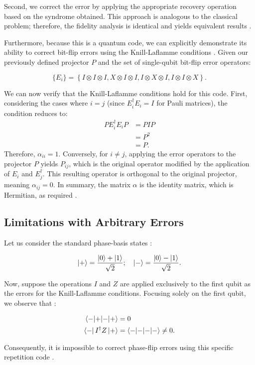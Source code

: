 Second, we correct the error by applying the appropriate recovery operation based on the syndrome obtained. This approach is analogous to the classical problem; therefore, the fidelity analysis is identical and yields equivalent results \citep{Nielsen2010}.

Furthermore, because this is a quantum code, we can explicitly demonstrate its ability to correct bit-flip errors using the Knill-Laflamme conditions \citep{Nielsen2010}. Given our previously defined projector $P$ and the set of single-qubit bit-flip error operators:

\begin{equation}
\{E_i\} = \left\{I \otimes I \otimes I, X \otimes I \otimes I, I \otimes X \otimes I, I \otimes I \otimes X \right\}
.\end{equation}

We can now verify that the Knill-Laflamme conditions hold for this code. First, considering the cases where $i = j$ (since $E_i^\dagger E_i = I$ for Pauli matrices), the condition reduces to:
\begin{align*}
  P E_i^\dagger E_i P &= P I P \\
  &= P^2 \\
  &= P
.\end{align*}
Therefore, $\alpha_{ii} = 1$. Conversely, for $i \neq j$, applying the error operators to the projector $P$ yields $P_{ij}$, which is the original operator modified by the application of $E_i$ and $E_j^\dagger$. This resulting operator is orthogonal to the original projector, meaning $\alpha_{ij} = 0$. In summary, the matrix $\alpha$ is the identity matrix, which is Hermitian, as required \citep{Nielsen2010}.

\subsection{Limitations with Arbitrary Errors}

Let us consider the standard phase-basis states \citep{Nielsen2010}:

\begin{equation}
  \ket{+} = \frac{\ket{0} + \ket{1}}{\sqrt{2}};\quad \ket{-} = \frac{\ket{0} - \ket{1}}{\sqrt{2}}
  \label{eq:hadamard_phase}
.\end{equation}

Now, suppose the operations $I$ and $Z$ are applied exclusively to the first qubit as the errors for the Knill-Laflamme conditions. Focusing solely on the first qubit, we observe that \citep{Nielsen2010}:

\begin{align*}
  \braket{-|+} &= 0 \\
  \bra{-}I^{\dagger}Z\ket{+} &= \braket{-|-} \neq 0
.\end{align*}

Consequently, it is impossible to correct phase-flip errors using this specific repetition code \citep{Nielsen2010}.
